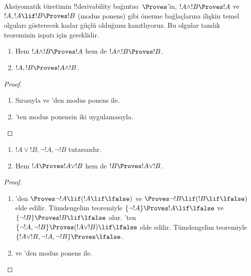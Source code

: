\documentclass[../../../include/open-logic-section]{subfiles}
\begin{document}
      {}
      {}


\begin{explain}
  Aksiyomatik türetimin !!{derivability} bağıntısı~$\Proves$'in,
  $!A \land !B \Proves !A$ ve $!A, !A \lif !B \Proves !B$ (modus ponens)
  gibi önerme bağlaçlarına ilişkin temel olguları gösterecek kadar güçlü
  olduğunu kanıtlıyoruz. Bu olgular tamlık teoreminin ispatı için gereklidir.
\end{explain}

\begin{prop}
  \begin{enumerate}
  \item {} Hem $!A \land !B \Proves !A$
    hem de $!A \land !B \Proves !B$.
  \item {} $!A, !B \Proves !A \land !B$.
  \end{enumerate}
\end{prop}

\begin{proof}
  \begin{enumerate}
  \item Sırasıyla  ve 'den modus
    ponens ile.
  \item {}'ten modus ponensin iki uygulamasıyla.
  \end{enumerate}
\end{proof}

\begin{prop}
  \begin{enumerate}
  \item $!A \lor !B, \lnot !A, \lnot !B$ tutarsızdır.
  \item Hem $!A \Proves !A \lor !B$ hem de $!B \Proves !A \lor !B$.
  \end{enumerate}
\end{prop}

\begin{proof}
  \begin{enumerate}
  \item {}'den $\Proves \lnot !A \lif
    (!A \lif \lfalse)$ ve $\Proves \lnot !B \lif (!B \lif \lfalse)$
    elde edilir. Tümdengelim teoremiyle $\{\lnot !A\} \Proves
    !A \lif \lfalse$ ve $\{\lnot !B\} \Proves !B \lif \lfalse$ olur.
    'ten $\{\lnot !A, \lnot !B\} \Proves
    (!A \lor !B) \lif \lfalse$ elde edilir. Tümdengelim teoremiyle
    $\{!A \lor !B, \lnot !A, \lnot !B\} \Proves \lfalse$.
  \item {} ve 'den modus ponens ile.
  \end{enumerate}
\end{proof}
\end{document}
